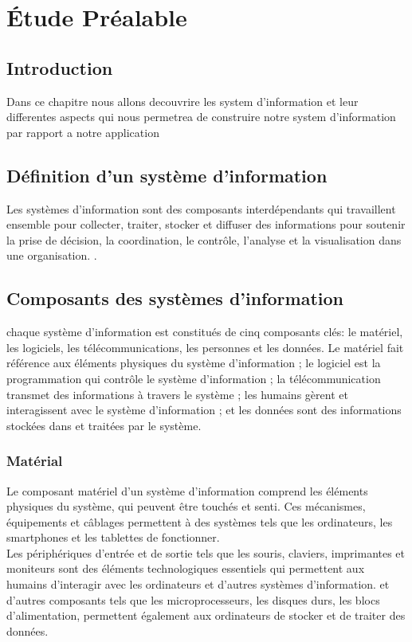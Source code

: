 \chapter{Étude Préalable }
\section{Introduction }

\par Dans ce chapitre nous allons decouvrire les system d'information et leur
differentes aspects qui nous permetrea de construire notre system d'information
par rapport a notre application


\section{Définition d'un système d'information }
\par Les systèmes d'information sont des composants interdépendants qui
travaillent ensemble pour collecter, traiter, stocker et diffuser des
informations pour soutenir la prise de décision, la coordination, le contrôle,
l'analyse et la visualisation dans une organisation.
\cite{ref1}.

\section{Composants des systèmes d'information }
\par chaque système d'information est constitués de cinq composants clés: le
matériel, les logiciels, les télécommunications, les personnes et les données.
Le matériel fait référence aux éléments physiques du système d'information ; le
logiciel est la programmation qui contrôle le système d'information ; la
télécommunication transmet des informations à travers le système ; les humains
gèrent et interagissent avec le système d'information ; et les données sont des
informations stockées dans et traitées par le système.

\subsection{Matérial }
\par Le composant matériel d'un système d'information comprend les éléments
physiques du système, qui peuvent être touchés et senti. Ces mécanismes,
équipements et câblages permettent à des systèmes tels que les ordinateurs, les
smartphones et les tablettes de fonctionner.\\
Les périphériques d'entrée et de sortie tels que les souris, claviers,
imprimantes et moniteurs sont des éléments technologiques essentiels qui
permettent aux humains d'interagir avec les ordinateurs et d'autres systèmes
d'information. et d’autres composants tels que les microprocesseurs, les
disques durs, les blocs d'alimentation, permettent également aux ordinateurs de
stocker et de traiter des données.

